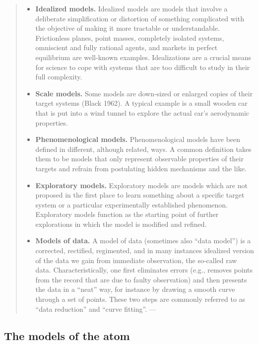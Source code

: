 \documentclass[
]{book}
\providecommand{\tightlist}{%
  \setlength{\itemsep}{0pt}\setlength{\parskip}{0pt}}
\begin{document}
\begin{quote}
\begin{itemize}
\tightlist
\item
  \textbf{Idealized models.} Idealized models are models that involve a deliberate simplification or distortion of something complicated with the objective of making it more tractable or understandable. Frictionless planes, point masses, completely isolated systems, omniscient and fully rational agents, and markets in perfect equilibrium are well-known examples. Idealizations are a crucial means for science to cope with systems that are too difficult to study in their full complexity.
\item
  \textbf{Scale models.} Some models are down-sized or enlarged copies of their target systems (Black 1962). A typical example is a small wooden car that is put into a wind tunnel to explore the actual car's aerodynamic properties.
\item
  \textbf{Phenomenological models.} Phenomenological models have been defined in different, although related, ways. A common definition takes them to be models that only represent observable properties of their targets and refrain from postulating hidden mechanisms and the like.
\item
  \textbf{Exploratory models.} Exploratory models are models which are not proposed in the first place to learn something about a specific target system or a particular experimentally established phenomenon. Exploratory models function as the starting point of further explorations in which the model is modified and refined.
\item
  \textbf{Models of data.} A model of data (sometimes also ``data model'') is a corrected, rectified, regimented, and in many instances idealized version of the data we gain from immediate observation, the so-called raw data. Characteristically, one first eliminates errors (e.g., removes points from the record that are due to faulty observation) and then presents the data in a ``neat'' way, for instance by drawing a smooth curve through a set of points. These two steps are commonly referred to as ``data reduction'' and ``curve fitting''.
  --- \citep{sep-models-science}
\end{itemize}
\end{quote}

\hypertarget{the-models-of-the-atom}{%
\subsection{The models of the atom}\label{the-models-of-the-atom}}
\end{document}
